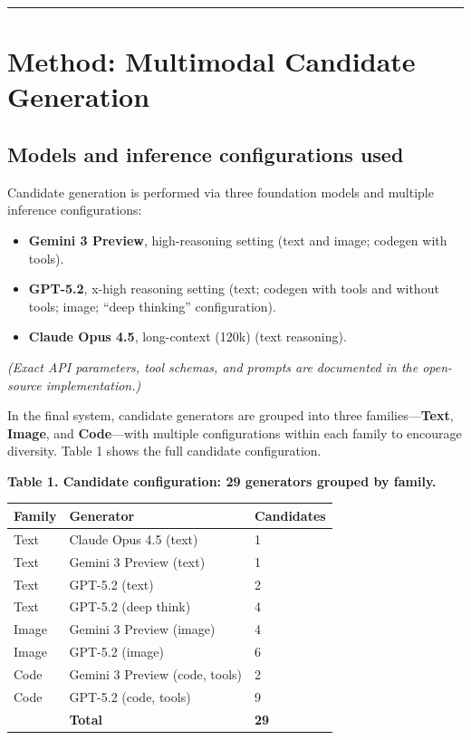 \documentclass[11pt]{article}
\providecommand{\tightlist}{%
  \setlength{\itemsep}{0pt}\setlength{\parskip}{0pt}}
\begin{document}
\begin{center}\rule{0.5\linewidth}{0.5pt}\end{center}

\hypertarget{method-multimodal-candidate-generation}{%
\section{Method: Multimodal Candidate
Generation}\label{method-multimodal-candidate-generation}}

\hypertarget{models-and-inference-configurations-used}{%
\subsection{Models and inference configurations
used}\label{models-and-inference-configurations-used}}

Candidate generation is performed via three foundation models and
multiple inference configurations:

\begin{itemize}
\tightlist
\item
  \textbf{Gemini 3 Preview}, high-reasoning setting (text and image;
  codegen with tools).
\item
  \textbf{GPT-5.2}, x-high reasoning setting (text; codegen with tools
  and without tools; image; ``deep thinking'' configuration).
\item
  \textbf{Claude Opus 4.5}, long-context (120k) (text reasoning).
\end{itemize}

\emph{(Exact API parameters, tool schemas, and prompts are documented in
the open-source implementation.)}

In the final system, candidate generators are grouped into three
families---\textbf{Text}, \textbf{Image}, and \textbf{Code}---with
multiple configurations within each family to encourage diversity. Table
1 shows the full candidate configuration.

\textbf{Table 1. Candidate configuration: 29 generators grouped by
family.}

\begin{longtable}[]{@{}lll@{}}
\toprule\noalign{}
Family & Generator & Candidates \\
\midrule\noalign{}
\endhead
\bottomrule\noalign{}
\endlastfoot
Text & Claude Opus 4.5 (text) & 1 \\
Text & Gemini 3 Preview (text) & 1 \\
Text & GPT-5.2 (text) & 2 \\
Text & GPT-5.2 (deep think) & 4 \\
Image & Gemini 3 Preview (image) & 4 \\
Image & GPT-5.2 (image) & 6 \\
Code & Gemini 3 Preview (code, tools) & 2 \\
Code & GPT-5.2 (code, tools) & 9 \\
& \textbf{Total} & \textbf{29} \\
\end{longtable}
\end{document}
